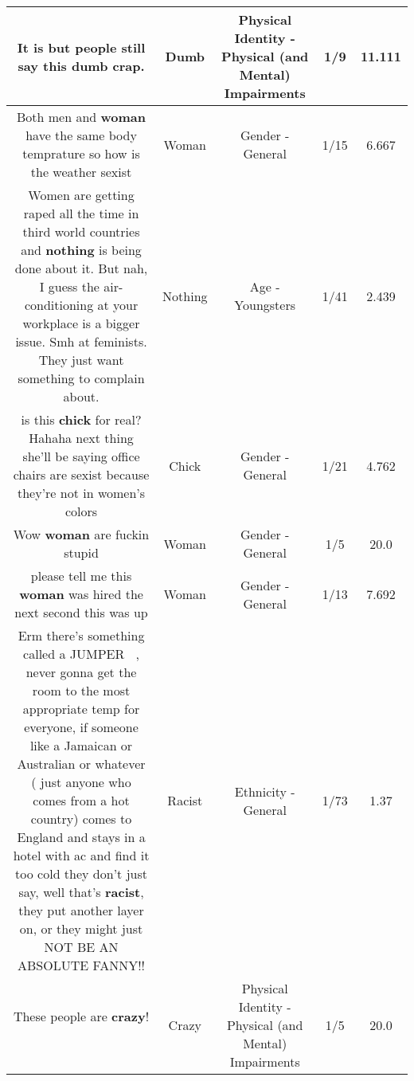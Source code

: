 \documentclass[11pt]{article}
\newlength\mylength
\begin{document}
\begin{center}
\begin{longtable}{|C{.65\mylength}|C{.30\mylength}|C{.12\mylength}|C{.12\mylength}|C{.12\mylength}|}
  \small It is but people still say this \textbf{dumb} crap.\normalsize   & Dumb & Physical Identity - Physical (and Mental) Impairments & 1/9 & 11.111 \\  \hline
  \small Both men and \textbf{woman} have the same body temprature so how is the weather sexist\normalsize   & Woman & Gender - General & 1/15 & 6.667 \\  \hline
  \small Women are getting raped all the time in third world countries and \textbf{nothing} is being done about it. But nah, I guess the air-conditioning at your workplace is a bigger issue. Smh at feminists. They just want something to complain about.\normalsize   & Nothing & Age - Youngsters & 1/41 & 2.439 \\  \hline
  \small is this \textbf{chick} for real? Hahaha next thing she'll be saying office chairs are sexist because they're not in women's colors\normalsize   & Chick & Gender - General & 1/21 & 4.762 \\  \hline
  \small Wow \textbf{woman} are fuckin stupid\normalsize   & Woman & Gender - General & 1/5 & 20.0 \\  \hline
  \small please tell me this \textbf{woman} was hired the next second this was up\normalsize   & Woman & Gender - General & 1/13 & 7.692 \\  \hline
  \small Erm there's something called a JUMPER 🤦‍♂️, never gonna get the room to the most appropriate temp for everyone, if someone like a Jamaican or Australian or whatever ( just anyone who comes from a hot country) comes to England and stays in a hotel with ac and find it too cold they don't just say, well that's \textbf{racist}, they put another layer on, or they might just NOT BE AN ABSOLUTE FANNY!!\normalsize   & Racist & Ethnicity - General & 1/73 & 1.37 \\  \hline
  \small These people are \textbf{crazy}! 🤣\normalsize   & Crazy & Physical Identity - Physical (and Mental) Impairments & 1/5 & 20.0 \\  \hline

\end{longtable}
\end{center}
\end{document}
